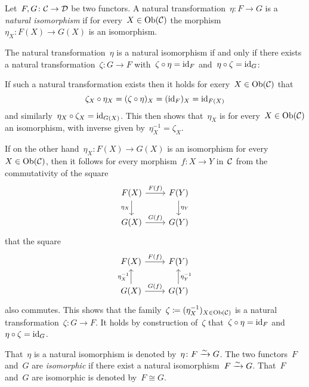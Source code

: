 \begin{remarkdefinition}
  Let~$F, G \colon \mathcal{C} \to \mathcal{D}$ be two functors.
  A natural transformation~$\eta \colon F \to G$ is a \emph{natural isomorphism} if for every~$X \in \operatorname{Ob}(\mathcal{C})$ the morphism~$\eta_X \colon F(X) \to G(X)$ is an isomorphism.
  
  The natural transformation~$\eta$ is a natural isomorphism if and only if there exists a natural transformation~$\zeta \colon G \to F$ with~$\zeta \circ \eta = \operatorname{id}_F$ and~$\eta \circ \zeta = \operatorname{id}_G$:
  
  If such a natural transformation exists then it holds for exery~$X \in \operatorname{Ob}(\mathcal{C})$ that
  \[
      \zeta_X \circ \eta_X
    = (\zeta \circ \eta)_X
    = (\operatorname{id}_F)_X
    = \operatorname{id}_{F(X)}
  \]
  and similarly~$\eta_X \circ \zeta_X = \operatorname{id}_{G(X)}$.
  This then shows that~$\eta_X$ is for every~$X \in \operatorname{Ob}(\mathcal{C})$ an isomorphism, with inverse given by~$\eta_X^{-1} = \zeta_X$.
  
  If on the other hand~$\eta_X \colon F(X) \to G(X)$ is an isomorphism for every~$X \in \operatorname{Ob}(\mathcal{C})$, then it follows for every morphism~$f \colon X \to Y$ in~$\mathcal{C}$ from the commutativity of the square
  \[
    \begin{tikzcd}
        F(X)
        \arrow{r}[above]{F(f)}
        \arrow{d}[left]{\eta_X}
      & F(Y)
        \arrow{d}[right]{\eta_Y}
      \\
        G(X)
        \arrow{r}[above]{G(f)}
      & G(Y)
    \end{tikzcd}
  \]
  that the square
  \[
    \begin{tikzcd}
        F(X)
        \arrow{r}[above]{F(f)}
      & F(Y)
      \\
        G(X)
        \arrow{u}[left]{\eta_X^{-1}}
        \arrow{r}[above]{G(f)}
      & G(Y)
        \arrow{u}[right]{\eta_Y^{-1}}
    \end{tikzcd}
  \]
  also commutes.
  This shows that the family~$\zeta \coloneqq (\eta_X^{-1})_{X \in \operatorname{Ob}(\mathcal{C})}$ is a natural transformation~$\zeta \colon G \to F$.
  It holds by construction of~$\zeta$ that~$\zeta \circ \eta = \operatorname{id}_F$ and~$\eta \circ \zeta = \operatorname{id}_G$.
  
  That~$\eta$ is a natural isomorphism is denoted by~$\eta \colon F \xrightarrow{\sim} G$.
  The two functors~$F$ and~$G$ are \emph{isomorphic} if there exist a natural isomorphism~$F \xrightarrow{\sim} G$.
  That~$F$ and~$G$ are isomorphic is denoted by~$F \cong G$.
\end{remarkdefinition}


